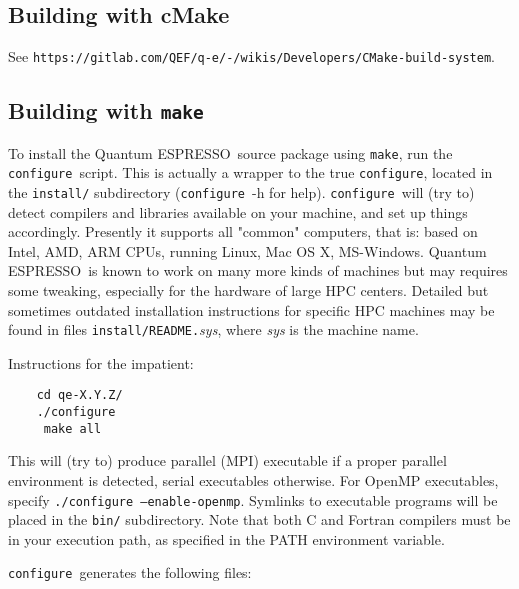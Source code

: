 \documentclass[12pt,a4paper]{article}
\def\qe{{\sc Quantum ESPRESSO}}
\def\configure{\texttt{configure}}
\def\make{\texttt{make}}
\begin{document}
\subsection{Building with cMake}

See \texttt{https://gitlab.com/QEF/q-e/-/wikis/Developers/CMake-build-system}.

\subsection{Building with \make}

To install the \qe\ source package using \make, run the \configure{}ript. This is actually a wrapper to the true \configure,
located in the \texttt{install/} subdirectory (\configure\ -h for help).
\configure\ will (try to) detect compilers and libraries available on
your machine, and set up things accordingly. Presently it supports
all "common" computers, that is: based on Intel, AMD, ARM CPUs,
running Linux, Mac OS X, MS-Windows. \qe\ is known to work on many
more kinds of machines but may requires some tweaking, especially for
the hardware of large HPC centers. Detailed but sometimes outdated
installation instructions for specific HPC machines may be found in
files \texttt{install/README.}{\em sys}, where {\em sys} is the machine name.

Instructions for the impatient:
\begin{verbatim}
    cd qe-X.Y.Z/
    ./configure
     make all
\end{verbatim}
This will (try to) produce parallel (MPI) executable if a proper parallel
environment is detected, serial executables otherwise. For OpenMP executables,
specify \texttt{./configure --enable-openmp}. Symlinks to executable programs
will be placed in the \texttt{bin/}
subdirectory. Note that both C and Fortran compilers must be in your execution
path, as specified in the PATH environment variable.

\noindent \configure\ generates the following files:
\end{document}
